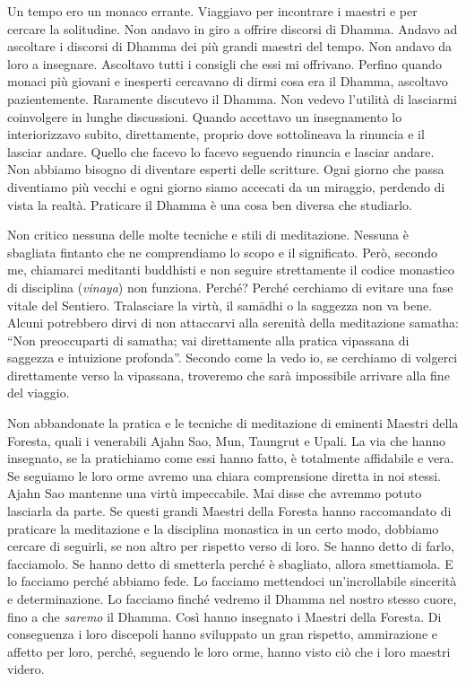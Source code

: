 Un tempo ero un monaco errante. Viaggiavo per incontrare i maestri e per
cercare la solitudine. Non andavo in giro a offrire discorsi di Dhamma.
Andavo ad ascoltare i discorsi di Dhamma dei più grandi maestri del
tempo. Non andavo da loro a insegnare. Ascoltavo tutti i consigli che
essi mi offrivano. Perfino quando monaci più giovani e inesperti
cercavano di dirmi cosa era il Dhamma, ascoltavo pazientemente.
Raramente discutevo il Dhamma. Non vedevo l'utilità di lasciarmi
coinvolgere in lunghe discussioni. Quando accettavo un insegnamento lo
interiorizzavo subito, direttamente, proprio dove sottolineava la
rinuncia e il lasciar andare. Quello che facevo lo facevo seguendo
rinuncia e lasciar andare. Non abbiamo bisogno di diventare esperti
delle scritture. Ogni giorno che passa diventiamo più vecchi e ogni
giorno siamo accecati da un miraggio, perdendo di vista la realtà.
Praticare il Dhamma è una cosa ben diversa che studiarlo.

Non critico nessuna delle molte tecniche e stili di meditazione. Nessuna
è sbagliata fintanto che ne comprendiamo lo scopo e il significato.
Però, secondo me, chiamarci meditanti buddhisti e non seguire
strettamente il codice monastico di disciplina (\emph{vinaya}) non
funziona. Perché? Perché cerchiamo di evitare una fase vitale del
Sentiero. Tralasciare la virtù, il samādhi o la saggezza non va bene.
Alcuni potrebbero dirvi di non attaccarvi alla serenità della
meditazione samatha: ``Non preoccuparti di samatha; vai direttamente
alla pratica vipassana di saggezza e intuizione profonda''. Secondo come
la vedo io, se cerchiamo di volgerci direttamente verso la vipassana,
troveremo che sarà impossibile arrivare alla fine del viaggio.

Non abbandonate la pratica e le tecniche di meditazione di eminenti
Maestri della Foresta, quali i venerabili Ajahn Sao, Mun, Taungrut e
Upali. La via che hanno insegnato, se la pratichiamo come essi hanno
fatto, è totalmente affidabile e vera. Se seguiamo le loro orme avremo
una chiara comprensione diretta in noi stessi. Ajahn Sao mantenne una
virtù impeccabile. Mai disse che avremmo potuto lasciarla da parte. Se
questi grandi Maestri della Foresta hanno raccomandato di praticare la
meditazione e la disciplina monastica in un certo modo, dobbiamo cercare
di seguirli, se non altro per rispetto verso di loro. Se hanno detto di
farlo, facciamolo. Se hanno detto di smetterla perché è sbagliato,
allora smettiamola. E lo facciamo perché abbiamo fede. Lo facciamo
mettendoci un'incrollabile sincerità e determinazione. Lo facciamo
finché vedremo il Dhamma nel nostro stesso cuore, fino a
che \emph{saremo} il Dhamma. Così hanno insegnato i Maestri della
Foresta. Di conseguenza i loro discepoli hanno sviluppato un gran
rispetto, ammirazione e affetto per loro, perché, seguendo le loro orme,
hanno visto ciò che i loro maestri videro.

